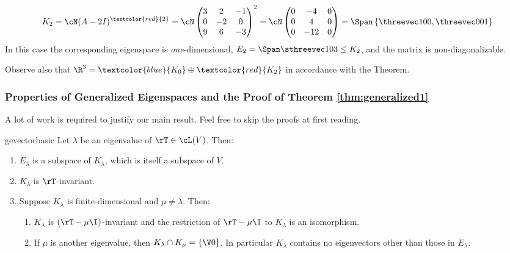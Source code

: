\begin{examples}{}{}
\begin{enumerate}
\begin{itemize}
  \[K_2=\cN(A-2I)^{\textcolor{red}{2}} =\cN\begin{pmatrix}
  3&2&-1\\0&-2&0\\9&6&-3
  \end{pmatrix}^2 =\cN\begin{pmatrix}
  0&-4&0\\0&4&0\\0&-12&0
  \end{pmatrix}=\Span\left\{\threevec 100,\threevec 001\right\}\]
  In this case the corresponding eigenspace is \emph{one}-dimensional, $E_2=\Span\sthreevec 103\lneq K_2$, and the matrix is non-diagonalizable.
\end{itemize}
Observe also that $\R^3=\textcolor{blue}{K_0}\oplus \textcolor{red}{K_2}$ in accordance with the Theorem.
\end{enumerate}
\end{examples}

\subsubsection*{Properties of Generalized Eigenspaces and the Proof of Theorem \ref{thm:generalized1}}

A lot of work is required to justify our main result. Feel free to skip the proofs at first reading.

\begin{lemm}{}{gevectorbasic}
Let $\lambda$ be an eigenvalue of $\rT\in\cL(V)$. Then:
\begin{enumerate}
  \item $E_\lambda$ is a subspace of $K_\lambda$, which is itself a subspace of $V$.
  \item $K_\lambda$ is $\rT$-invariant.
  \item Suppose $K_\lambda$ is finite-dimensional and $\mu\neq \lambda$. Then:
  \begin{enumerate}
    \item $K_\lambda$ is $(\rT-\mu \I)$-invariant and the restriction of $\rT-\mu\I$ to $K_\lambda$ is an isomorphism.
    \item If $\mu$ is another eigenvalue, then $K_\lambda\cap K_\mu=\{\V0\}$. In particular $K_\lambda$ contains no eigenvectors other than those in $E_\lambda$. 
	\end{enumerate}
\end{enumerate}
\end{lemm}

